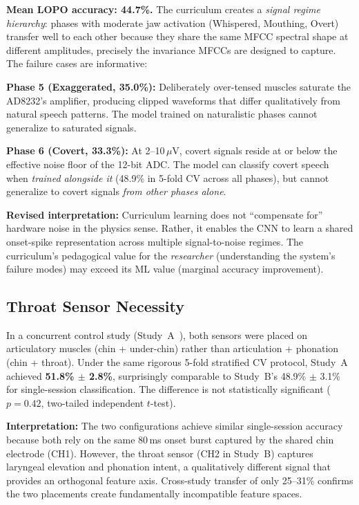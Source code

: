 \documentclass{article}
\begin{document}
\textbf{Mean LOPO accuracy: 44.7\%.} The curriculum creates a \emph{signal regime hierarchy}: phases with moderate jaw activation (Whispered, Mouthing, Overt) transfer well to each other because they share the same MFCC spectral shape at different amplitudes, precisely the invariance MFCCs are designed to capture. The failure cases are informative:

\textbf{Phase 5 (Exaggerated, 35.0\%):} Deliberately over-tensed muscles saturate the AD8232's amplifier, producing clipped waveforms that differ qualitatively from natural speech patterns. The model trained on naturalistic phases cannot generalize to saturated signals.

\textbf{Phase 6 (Covert, 33.3\%):} At 2--10\,$\mu$V, covert signals reside at or below the effective noise floor of the 12-bit ADC. The model can classify covert speech when \emph{trained alongside it} (48.9\% in 5-fold CV across all phases), but cannot generalize to covert signals \emph{from other phases alone}.

\textbf{Revised interpretation:} Curriculum learning does not ``compensate for'' hardware noise in the physics sense. Rather, it enables the CNN to learn a shared onset-spike representation across multiple signal-to-noise regimes. The curriculum's pedagogical value for the \emph{researcher} (understanding the system's failure modes) may exceed its ML value (marginal accuracy improvement).

\subsection{Throat Sensor Necessity}

In a concurrent control study (Study~A~\cite{kho2026companion}), both sensors were placed on articulatory muscles (chin + under-chin) rather than articulation + phonation (chin + throat). Under the same rigorous 5-fold stratified CV protocol, Study~A achieved \textbf{51.8\% $\pm$ 2.8\%}, surprisingly comparable to Study~B's 48.9\% $\pm$ 3.1\% for single-session classification. The difference is not statistically significant ($p = 0.42$, two-tailed independent $t$-test).

\textbf{Interpretation:} The two configurations achieve similar single-session accuracy because both rely on the same 80\,ms onset burst captured by the shared chin electrode (CH1). However, the throat sensor (CH2 in Study~B) captures laryngeal elevation and phonation intent, a qualitatively different signal that provides an orthogonal feature axis. Cross-study transfer of only 25--31\% confirms the two placements create fundamentally incompatible feature spaces.
\end{document}
